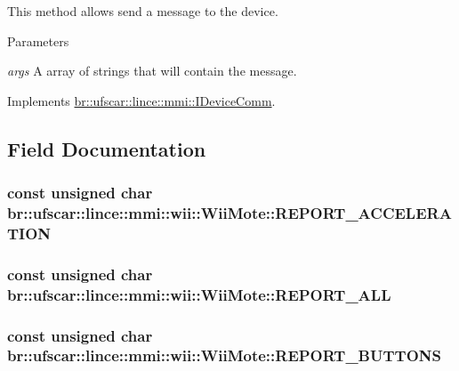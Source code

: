 This method allows send a message to the device. 


\begin{DoxyParams}{Parameters}
\item[{\em args}]A array of strings that will contain the message. \end{DoxyParams}


Implements \hyperlink{classbr_1_1ufscar_1_1lince_1_1mmi_1_1IDeviceComm_a0249a13030b4df9b50778723421375d9}{br::ufscar::lince::mmi::IDeviceComm}.



\subsection{Field Documentation}
\hypertarget{classbr_1_1ufscar_1_1lince_1_1mmi_1_1wii_1_1WiiMote_a31e84ef1eebb0340545dcd1b3bb3a0fc}{
\subsubsection[{REPORT\_\-ACCELERATION}]{\setlength{\rightskip}{0pt plus 5cm}const unsigned char {\bf br::ufscar::lince::mmi::wii::WiiMote::REPORT\_\-ACCELERATION}}}
\label{classbr_1_1ufscar_1_1lince_1_1mmi_1_1wii_1_1WiiMote_a31e84ef1eebb0340545dcd1b3bb3a0fc}
\hypertarget{classbr_1_1ufscar_1_1lince_1_1mmi_1_1wii_1_1WiiMote_a96872905a37ca4eb5902ea220217a54f}{
\subsubsection[{REPORT\_\-ALL}]{\setlength{\rightskip}{0pt plus 5cm}const unsigned char {\bf br::ufscar::lince::mmi::wii::WiiMote::REPORT\_\-ALL}}}
\label{classbr_1_1ufscar_1_1lince_1_1mmi_1_1wii_1_1WiiMote_a96872905a37ca4eb5902ea220217a54f}
\hypertarget{classbr_1_1ufscar_1_1lince_1_1mmi_1_1wii_1_1WiiMote_af1e2bc7d7054d1b4dab67e9b278017ce}{
\subsubsection[{REPORT\_\-BUTTONS}]{\setlength{\rightskip}{0pt plus 5cm}const unsigned char {\bf br::ufscar::lince::mmi::wii::WiiMote::REPORT\_\-BUTTONS}}}

